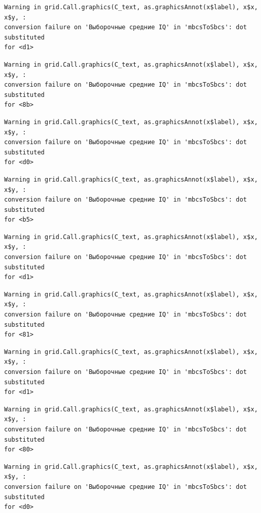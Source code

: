 \documentclass[
  letterpaper,
  DIV=11,
  numbers=noendperiod]{scrreprt}
\theoremstyle{definition}
\theoremstyle{remark}
\begin{document}
\begin{verbatim}
Warning in grid.Call.graphics(C_text, as.graphicsAnnot(x$label), x$x, x$y, :
conversion failure on 'Выборочные средние IQ' in 'mbcsToSbcs': dot substituted
for <d1>
\end{verbatim}

\begin{verbatim}
Warning in grid.Call.graphics(C_text, as.graphicsAnnot(x$label), x$x, x$y, :
conversion failure on 'Выборочные средние IQ' in 'mbcsToSbcs': dot substituted
for <8b>
\end{verbatim}

\begin{verbatim}
Warning in grid.Call.graphics(C_text, as.graphicsAnnot(x$label), x$x, x$y, :
conversion failure on 'Выборочные средние IQ' in 'mbcsToSbcs': dot substituted
for <d0>
\end{verbatim}

\begin{verbatim}
Warning in grid.Call.graphics(C_text, as.graphicsAnnot(x$label), x$x, x$y, :
conversion failure on 'Выборочные средние IQ' in 'mbcsToSbcs': dot substituted
for <b5>
\end{verbatim}

\begin{verbatim}
Warning in grid.Call.graphics(C_text, as.graphicsAnnot(x$label), x$x, x$y, :
conversion failure on 'Выборочные средние IQ' in 'mbcsToSbcs': dot substituted
for <d1>
\end{verbatim}

\begin{verbatim}
Warning in grid.Call.graphics(C_text, as.graphicsAnnot(x$label), x$x, x$y, :
conversion failure on 'Выборочные средние IQ' in 'mbcsToSbcs': dot substituted
for <81>
\end{verbatim}

\begin{verbatim}
Warning in grid.Call.graphics(C_text, as.graphicsAnnot(x$label), x$x, x$y, :
conversion failure on 'Выборочные средние IQ' in 'mbcsToSbcs': dot substituted
for <d1>
\end{verbatim}

\begin{verbatim}
Warning in grid.Call.graphics(C_text, as.graphicsAnnot(x$label), x$x, x$y, :
conversion failure on 'Выборочные средние IQ' in 'mbcsToSbcs': dot substituted
for <80>
\end{verbatim}

\begin{verbatim}
Warning in grid.Call.graphics(C_text, as.graphicsAnnot(x$label), x$x, x$y, :
conversion failure on 'Выборочные средние IQ' in 'mbcsToSbcs': dot substituted
for <d0>
\end{verbatim}
\end{document}
